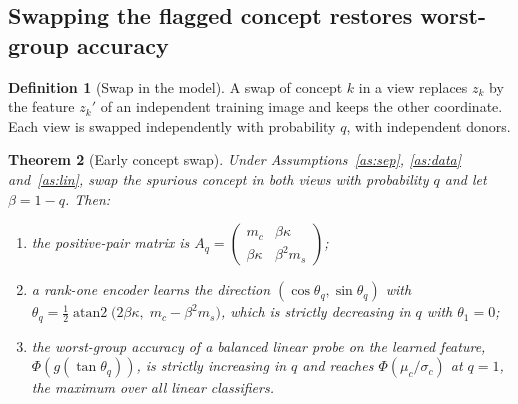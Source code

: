 \documentclass[11pt]{article}
\newtheorem{theorem}{Theorem}
\theoremstyle{definition}
\newtheorem{definition}[theorem]{Definition}
\theoremstyle{remark}
\begin{document}
\subsection{Swapping the flagged concept restores worst-group accuracy}

\begin{definition}[Swap in the model]\label{def:swap}
A swap of concept $k$ in a view replaces $z_k$ by the feature $z_k'$ of an independent training image and keeps the
other coordinate. Each view is swapped independently with probability $q$, with independent donors.
\end{definition}

\begin{theorem}[Early concept swap]\label{thm:swap}
Under Assumptions~\ref{as:sep}, \ref{as:data} and~\ref{as:lin}, swap the spurious concept in both views with
probability $q$ and let $\beta=1-q$. Then:
\begin{enumerate}[nosep,label=(\roman*)]
\item the positive-pair matrix is $A_q=\begin{pmatrix}m_c&\beta\kappa\\ \beta\kappa&\beta^2m_s\end{pmatrix}$;
\item a rank-one encoder learns the direction $(\cos\theta_q,\sin\theta_q)$ with
$\theta_q=\tfrac12\operatorname{atan2}\big(2\beta\kappa,\;m_c-\beta^2m_s\big)$, which is strictly decreasing in $q$
with $\theta_1=0$;
\item the worst-group accuracy of a balanced linear probe on the learned feature, $\Phi(g(\tan\theta_q))$, is
strictly increasing in $q$ and reaches $\Phi(\mu_c/\sigma_c)$ at $q=1$, the maximum over all linear classifiers.
\end{enumerate}
\end{theorem}
\end{document}
